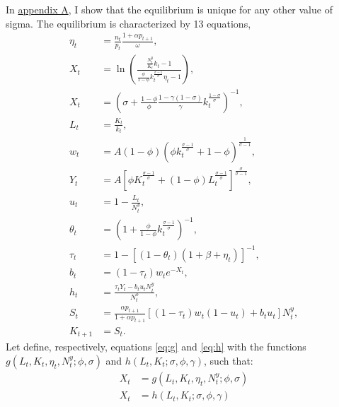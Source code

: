 In \hyperref[appendix:uniqueness]{appendix A}, I show that the equilibrium is unique for any other value of sigma. The equilibrium is characterized by 13 equations,
	\begin{align}
		\eta_t &= \frac{n_t}{p_t}\frac{1+\alpha p_{t+1}}{\omega}, \tag{Pub. $\eta$} \\
		X_t &= \ln\left( \frac{ \frac{N_t^y}{K_t} k_t - 1 } { \frac{\phi}{1-\phi} k_t^{\frac{\sigma-1}{\sigma}} \eta_t - 1 }\right), \label{eq:g}\tag{Eq. $g$} \\
		X_t &= \left( \sigma + \frac{1-\phi}{\phi} \frac{1-\gamma(1-\sigma)}{\gamma} k_t^{\frac{1-\sigma}{\sigma}} \right)^{-1}, \label{eq:h}\tag{Eq. $h$}\\
		L_t &= \frac{K_t}{k_t}, \tag{Prod. $L$} \\
		w_t &= A(1-\phi)\left( \phi k_t^\frac{\sigma-1}{\sigma} + 1-\phi \right)^\frac{1}{\sigma-1}, \tag{Prod. $w$}\\
		Y_t &= A \left[ \phi K_t^\frac{\sigma-1}{\sigma} + (1-\phi) L_t^\frac{\sigma-1}{\sigma} \right]^\frac{\sigma}{\sigma-1}, \tag{Prod. $Y$}\\
		u_t &= 1 - \frac{L_t}{N_t^y}, \tag{Prod. $u$}\\
		\theta_t &= \left(1 + \frac{\phi}{1-\phi} k_t^\frac{\sigma-1}{\sigma} \right)^{-1}, \tag{Prod. $\theta$} \\
		\tau_t &= 1 - \left[ (1-\theta_t)(1+\beta+\eta_t) \right]^{-1}, \tag{Pub. $\tau$}\\
		b_t &= (1-\tau_t) w_t e^{-X_t}, \tag{Pub. $b$}\\
		h_t &= \frac{\tau_t Y_t - b_t u_t N_t^y}{N_t^o}, \tag{Pub. $h$}\\
		S_t &= \frac{\alpha p_{t+1}}{1 + \alpha p_{t+1}} \left[ (1-\tau_t)w_t(1-u_t) + b_tu_t \right] N_t^y, \tag{HH. $S$}  \\
		K_{t+1} &= S_t.	\tag{HH. $K$}
	\end{align}
Let define, respectively, equations \eqref{eq:g} and \eqref{eq:h} with the functions $g(L_t, K_t, \eta_t, N_t^y; \phi, \sigma)$ and $h(L_t, K_t; \sigma, \phi, \gamma)$, such that:
	\begin{align*}
		X_t &= g(L_t, K_t, \eta_t, N_t^y; \phi, \sigma) 
		\\
		X_t &= h(L_t, K_t; \sigma, \phi, \gamma) 
	\end{align*}
